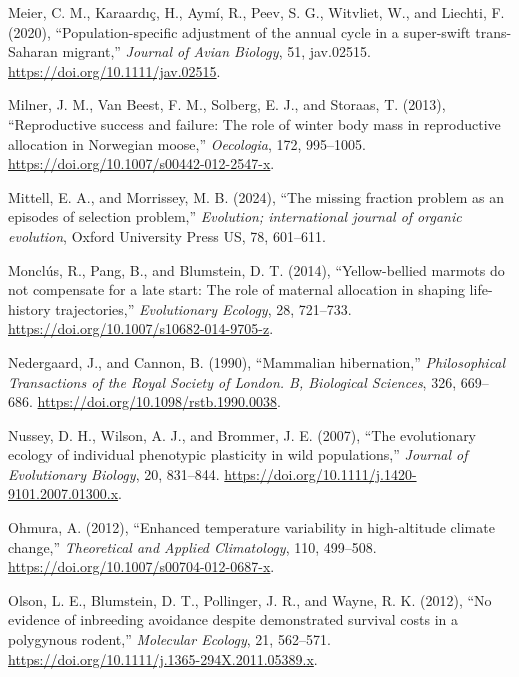 \documentclass[
  12pt,
  letterpaper,
]{scrartcl}
\newlength{\cslhangindent}
\newenvironment{CSLReferences}[2] %
 {\begin{list}{}{%
  \setlength{\itemindent}{0pt}
  \setlength{\leftmargin}{0pt}
  \setlength{\parsep}{0pt}
  \ifodd #1
   \setlength{\leftmargin}{\cslhangindent}
   \setlength{\itemindent}{-1\cslhangindent}
  \fi
  \setlength{\itemsep}{#2\baselineskip}}}
 {\end{list}}
\begin{document}
\begin{CSLReferences}{1}{0}
Meier, C. M., Karaardıç, H., Aymí, R., Peev, S. G., Witvliet, W., and
Liechti, F. (2020), {``Population-specific adjustment of the annual
cycle in a super-swift trans-{Saharan} migrant,''} \emph{Journal of
Avian Biology}, 51, jav.02515. \url{https://doi.org/10.1111/jav.02515}.

Milner, J. M., Van Beest, F. M., Solberg, E. J., and Storaas, T. (2013),
{``Reproductive success and failure: {The} role of winter body mass in
reproductive allocation in {Norwegian} moose,''} \emph{Oecologia}, 172,
995--1005. \url{https://doi.org/10.1007/s00442-012-2547-x}.

Mittell, E. A., and Morrissey, M. B. (2024), {``The missing fraction
problem as an episodes of selection problem,''} \emph{Evolution;
international journal of organic evolution}, Oxford University Press US,
78, 601--611.

Monclús, R., Pang, B., and Blumstein, D. T. (2014), {``Yellow-bellied
marmots do not compensate for a late start: {The} role of maternal
allocation in shaping life-history trajectories,''} \emph{Evolutionary
Ecology}, 28, 721--733. \url{https://doi.org/10.1007/s10682-014-9705-z}.

Nedergaard, J., and Cannon, B. (1990), {``Mammalian hibernation,''}
\emph{Philosophical Transactions of the Royal Society of London. B,
Biological Sciences}, 326, 669--686.
\url{https://doi.org/10.1098/rstb.1990.0038}.

Nussey, D. H., Wilson, A. J., and Brommer, J. E. (2007), {``The
evolutionary ecology of individual phenotypic plasticity in wild
populations,''} \emph{Journal of Evolutionary Biology}, 20, 831--844.
\url{https://doi.org/10.1111/j.1420-9101.2007.01300.x}.

Ohmura, A. (2012), {``Enhanced temperature variability in high-altitude
climate change,''} \emph{Theoretical and Applied Climatology}, 110,
499--508. \url{https://doi.org/10.1007/s00704-012-0687-x}.

Olson, L. E., Blumstein, D. T., Pollinger, J. R., and Wayne, R. K.
(2012), {``No evidence of inbreeding avoidance despite demonstrated
survival costs in a polygynous rodent,''} \emph{Molecular Ecology}, 21,
562--571. \url{https://doi.org/10.1111/j.1365-294X.2011.05389.x}.


\end{CSLReferences}
\end{document}
